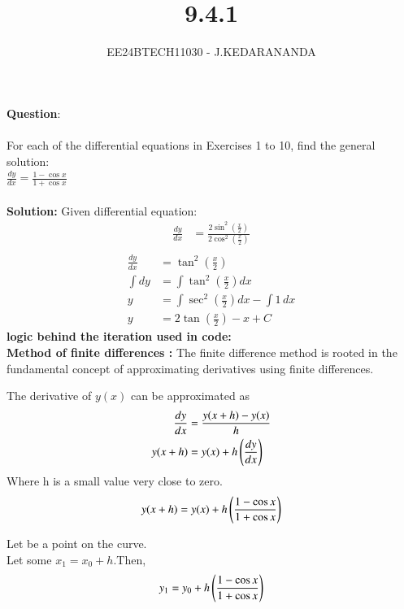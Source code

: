 \documentclass[journal]{IEEEtran}
\renewcommand{\thefigure}{\theenumi}
\renewcommand{\thetable}{\theenumi}
\numberwithin{equation}{enumi}
\numberwithin{figure}{enumi}
\renewcommand{\thetable}{\theenumi}
\begin{document}

\vspace{3cm}

\title{9.4.1}
\author{EE24BTECH11030 - J.KEDARANANDA}
{\let\newpage\relax\maketitle}
\renewcommand{\thefigure}{\theenumi}
\renewcommand{\thetable}{\theenumi}
\textbf{Question}:\\\\
For each of the differential equations in Exercises 1 to 10, find the general solution:\\
$\frac{dy}{dx}=\frac{1-\cos{x}}{1+\cos{x}}$
\\\\
\textbf{Solution: }
Given differential equation:
\begin{align}
    \frac{dy}{dx} &= \frac{2 \sin^2\left(\frac{x}{2}\right)}{2 \cos^2\left(\frac{x}{2}\right)} \\
\end{align}
\begin{align}
    \frac{dy}{dx} &= \tan^2\left(\frac{x}{2}\right) \\
    \int dy &= \int \tan^2\left(\frac{x}{2}\right) dx \\
    y &= \int \sec^2\left(\frac{x}{2}\right) dx - \int 1 \, dx \\
    y &= 2 \tan\left(\frac{x}{2}\right) - x + C
\end{align}
\textbf{logic behind the iteration used in code: }\\
\textbf{Method of finite differences :}
The finite difference method is rooted in the fundamental concept of approximating derivatives using finite differences.

The derivative of $y(x)$ can be approximated as 
\begin{align}
    \frac{dy}{dx}&=\frac{y(x+h)-y(x)}{h}\\
    y(x+h)&=y(x)+h\left(\frac{dy}{dx}\right)
\end{align}
Where h is a small value very close to zero.
\begin{align}
    y(x+h)=y(x)+h\left(\frac{1-\cos{x}}{1+\cos{x}}\right) 
\end{align}

Let  be a point on the curve.\\
Let some $x_1=x_0 +h$.Then,
\begin{align}
    y_1 = y_0+h\left(\frac{1-\cos{x}}{1+\cos{x}}\right) 
\end{align}
\end{document}
